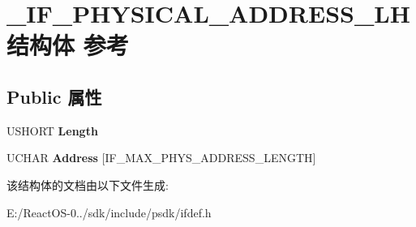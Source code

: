 \hypertarget{struct___i_f___p_h_y_s_i_c_a_l___a_d_d_r_e_s_s___l_h}{}\section{\+\_\+\+I\+F\+\_\+\+P\+H\+Y\+S\+I\+C\+A\+L\+\_\+\+A\+D\+D\+R\+E\+S\+S\+\_\+\+L\+H结构体 参考}
\label{struct___i_f___p_h_y_s_i_c_a_l___a_d_d_r_e_s_s___l_h}
\subsection*{Public 属性}
\begin{DoxyCompactItemize}
\item 
\mbox{\label{struct___i_f___p_h_y_s_i_c_a_l___a_d_d_r_e_s_s___l_h_a72ad2ed397b9948083044da42a17abea}} 
U\+S\+H\+O\+RT {\bfseries Length}
\item 
\mbox{\label{struct___i_f___p_h_y_s_i_c_a_l___a_d_d_r_e_s_s___l_h_aec715d3ccc52dfcb7e3a7f3d9972e2b5}} 
U\+C\+H\+AR {\bfseries Address} \mbox{[}I\+F\+\_\+\+M\+A\+X\+\_\+\+P\+H\+Y\+S\+\_\+\+A\+D\+D\+R\+E\+S\+S\+\_\+\+L\+E\+N\+G\+TH\mbox{]}
\end{DoxyCompactItemize}


该结构体的文档由以下文件生成\+:\begin{DoxyCompactItemize}
\item 
E\+:/\+React\+O\+S-\/0../sdk/include/psdk/ifdef.\+h\end{DoxyCompactItemize}
